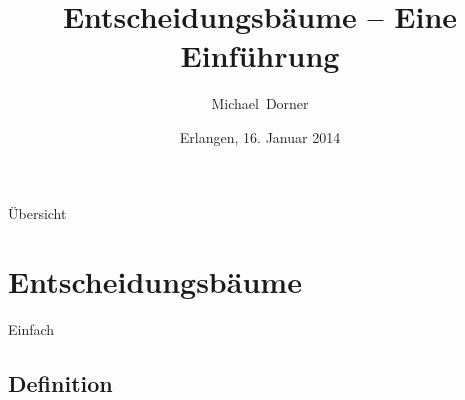 



\title[Softcomputing] 
{Entscheidungsbäume -- Eine Einführung}

\subtitle
{}

\author[] 
{Michael~Dorner}



\date[] 
{Erlangen, 16. Januar 2014}

\subject{Seminar Künstliche Intelligenz}








\begin{frame}[plain]
  \titlepage
\end{frame}

\begin{frame}{Übersicht}
  \begin{multicols}{2}
        \tableofcontents
    \end{multicols}
\end{frame}


\section{Entscheidungsbäume}

\begin{frame}{Einfach}


\end{frame}





\subsection{Definition}

